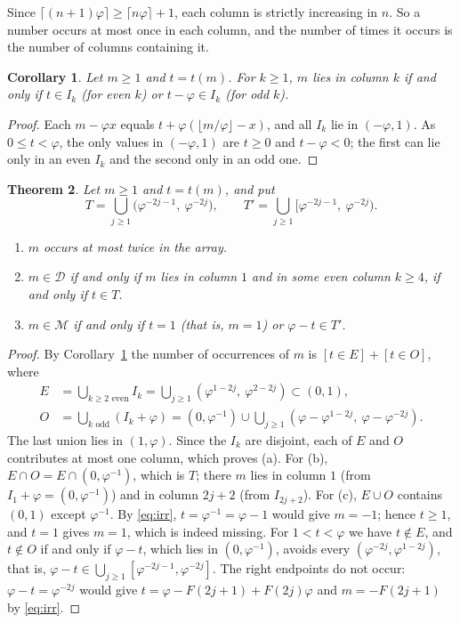 \documentclass[12pt]{article}
\newcommand{\fl}[1]{\lfloor #1 \rfloor}
\newcommand{\cl}[1]{\lceil #1 \rceil}
\newcommand{\D}{\mathcal{D}}
\newcommand{\M}{\mathcal{M}}
\theoremstyle{plain}
\newtheorem{theorem}{Theorem}
\newtheorem{corollary}[theorem]{Corollary}
\theoremstyle{remark}
\begin{document}
Since $\cl{(n+1)\varphi}\ge\cl{n\varphi}+1$, each column is strictly increasing in $n$. So a
number occurs at most once in each column, and the number of times it occurs is the number of
columns containing it.

\begin{corollary}\label{cor:t}
Let $m\ge1$ and $t=t(m)$. For $k\ge1$, $m$ lies in column $k$ if and only if $t\in I_k$ (for
even $k$) or $t-\varphi\in I_k$ (for odd $k$).
\end{corollary}

\begin{proof}
Each $m-\varphi x$ equals $t+\varphi(\fl{m/\varphi}-x)$, and all $I_k$ lie in $(-\varphi,1)$.
As $0\le t<\varphi$, the only values in $(-\varphi,1)$ are $t\ge0$ and $t-\varphi<0$; the first
can lie only in an even $I_k$ and the second only in an odd one.
\end{proof}

\begin{theorem}\label{thm:struct}
Let $m\ge1$ and $t=t(m)$, and put
\[
T=\bigcup_{j\ge1}\bigl(\varphi^{-2j-1},\ \varphi^{-2j}\bigr),\qquad
T'=\bigcup_{j\ge1}\bigl[\varphi^{-2j-1},\ \varphi^{-2j}\bigr).
\]
\begin{enumerate}
\item[(a)] $m$ occurs at most twice in the array.
\item[(b)] $m\in\D$ if and only if $m$ lies in column $1$ and in some even column $k\ge4$, if and
only if $t\in T$.
\item[(c)] $m\in\M$ if and only if $t=1$ (that is, $m=1$) or $\varphi-t\in T'$.
\end{enumerate}
\end{theorem}

\begin{proof}
By Corollary~\ref{cor:t} the number of occurrences of $m$ is
$[t\in E]+[t\in O]$, where
\begin{align*}
E&=\bigcup_{k\ge2\text{ even}}I_k=\bigcup_{j\ge1}(\varphi^{1-2j},\ \varphi^{2-2j})\subset(0,1),\\
O&=\bigcup_{k\text{ odd}}(I_k+\varphi)=(0,\varphi^{-1})\cup
\bigcup_{j\ge1}(\varphi-\varphi^{1-2j},\ \varphi-\varphi^{-2j}).
\end{align*}
The last union lies in $(1,\varphi)$. Since the $I_k$ are disjoint, each of $E$ and $O$
contributes at most one column, which proves (a). For (b), $E\cap O=E\cap(0,\varphi^{-1})$,
which is $T$; there $m$ lies in column $1$ (from $I_1+\varphi=(0,\varphi^{-1})$) and in column
$2j+2$ (from $I_{2j+2}$). For (c), $E\cup O$ contains $(0,1)$ except $\varphi^{-1}$. By
\eqref{eq:irr}, $t=\varphi^{-1}=\varphi-1$ would give $m=-1$; hence $t\ge1$, and $t=1$ gives
$m=1$, which is indeed missing. For $1<t<\varphi$ we have $t\notin E$, and $t\notin O$ if and
only if $\varphi-t$, which lies in $(0,\varphi^{-1})$, avoids every
$(\varphi^{-2j},\varphi^{1-2j})$, that is, $\varphi-t\in\bigcup_{j\ge1}[\varphi^{-2j-1},\varphi^{-2j}]$.
The right endpoints do not occur: $\varphi-t=\varphi^{-2j}$ would give
$t=\varphi-F(2j+1)+F(2j)\varphi$ and $m=-F(2j+1)$ by \eqref{eq:irr}.
\end{proof}
\end{document}

